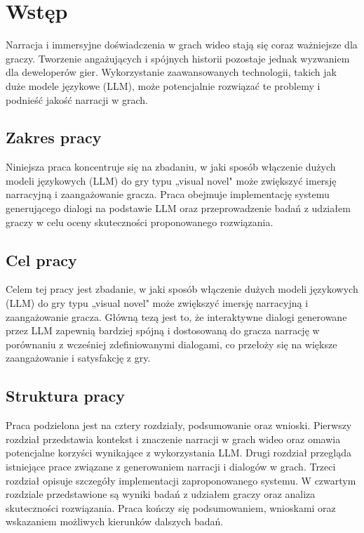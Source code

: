 
\chapter*{Wstęp}\label{chapter:introduction}

Narracja i immersyjne doświadczenia w grach wideo stają się coraz ważniejsze dla graczy. Tworzenie angażujących
i spójnych historii pozostaje jednak wyzwaniem dla deweloperów gier. Wykorzystanie zaawansowanych technologii,
takich jak duże modele językowe (LLM), może potencjalnie rozwiązać te problemy i podnieść jakość narracji w grach.

\section*{Zakres pracy}

Niniejsza praca koncentruje się na zbadaniu, w jaki sposób włączenie dużych modeli językowych (LLM) do gry
typu „visual novel" może zwiększyć imersję narracyjną i zaangażowanie gracza. Praca obejmuje implementację systemu
generującego dialogi na podstawie LLM oraz przeprowadzenie badań z udziałem graczy w celu oceny skuteczności
proponowanego rozwiązania.

\section*{Cel pracy}

Celem tej pracy jest zbadanie, w jaki sposób włączenie dużych modeli językowych (LLM) do gry typu „visual novel"
może zwiększyć imersję narracyjną i zaangażowanie gracza. Główną tezą jest to, że interaktywne dialogi generowane
przez LLM zapewnią bardziej spójną i dostosowaną do gracza narrację w porównaniu z wcześniej zdefiniowanymi
dialogami, co przełoży się na większe zaangażowanie i satysfakcję z gry.

\section*{Struktura pracy}

Praca podzielona jest na cztery rozdziały, podsumowanie oraz wnioski. Pierwszy rozdział przedstawia kontekst i
znaczenie narracji w grach wideo oraz omawia potencjalne korzyści wynikające z wykorzystania LLM. Drugi rozdział
przegląda istniejące prace związane z generowaniem narracji i dialogów w grach. Trzeci rozdział opisuje szczegóły
implementacji zaproponowanego systemu. W czwartym rozdziale przedstawione są wyniki badań z udziałem graczy oraz
analiza skuteczności rozwiązania. Praca kończy się podsumowaniem, wnioskami oraz wskazaniem możliwych kierunków
dalszych badań.